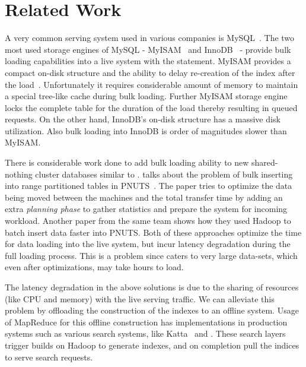 \section{Related Work}
\label{sec:related_work}
A very common serving system used in various companies is MySQL~\cite{mysql}. The two most used storage engines of MySQL - MyISAM~\cite{myisam} and InnoDB~\cite{innodb} - provide bulk loading capabilities into a live system with the  statement. MyISAM provides a compact on-disk structure and the ability to delay re-creation of the index after the load~\cite{bulk}.  Unfortunately it requires considerable amount of memory to maintain a special tree-like cache during bulk loading. 
Further MyISAM storage engine locks the complete table for the duration of the load thereby resulting in queued requests. On the other hand, InnoDB's on-disk structure has a massive disk utilization. Also bulk loading into InnoDB is order of magnitudes slower than MyISAM. 

There is considerable work done to add bulk loading ability to new shared-nothing cluster\cite{sharednothing} databases similar to \projectname{}. \cite{silberstein} talks about the problem of bulk inserting into range partitioned tables in PNUTS~\cite{pnuts}. The paper tries to optimize the data being moved between the machines and the total transfer time by adding an extra \emph {planning phase} to gather statistics and prepare the system for incoming workload. Another paper from the same team \cite{pnutsbatch} shows how they used Hadoop to batch insert data faster into PNUTS. Both of these approaches optimize the time for data loading into the live system, but incur latency degradation during the full loading process. This is a problem since \projectname{} caters to very large data-sets, which even after optimizations, may take hours to load.  

The latency degradation in the above solutions is due to the sharing of resources (like CPU and memory) with the live serving traffic. We can alleviate this problem by offloading the construction of the indexes to an offline system. Usage of MapReduce for this offline construction has implementations in production systems such as various search systems, like Katta~\cite{katta} and \cite{mika}. These search layers trigger builds on Hadoop to generate indexes, and on completion pull the indices to serve search requests. 

